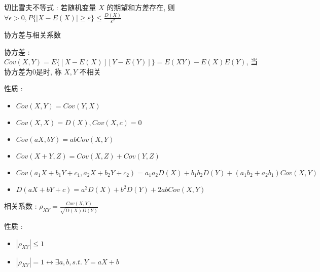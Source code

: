 \documentclass[UTF8, 12pt]{ctexart}
\begin{document}
	\noindent 切比雪夫不等式 : 若随机变量 $ X $ 的期望和方差存在, 则 $ \forall \epsilon > 0, P\{|X-E(X)| \geq \varepsilon\} \leq \frac{D(X)}{\varepsilon^{2}} $

	\noindent 协方差与相关系数

		协方差 : $ Cov(X, Y) = E\{[X-E(X)][Y-E(Y)]\} = E(XY) - E(X)E(Y) $, 当协方差为0是时, 称 $ X, Y $ 不相关

		性质 :
		\begin{itemize}[leftmargin = 4em]
			\item $ Cov(X, Y) = Cov(Y, X) $
			\item $ Cov(X, X) = D(X), Cov(X, c) = 0 $
			\item $ Cov(aX, bY) = abCov(X, Y) $
			\item $ Cov(X + Y, Z) = Cov(X, Z) + Cov(Y, Z) $
			\item $ Cov(a_{1}X + b_{1}Y + c_{1}, a_{2}X + b_{2}Y + c_{2}) = a_{1}a_{2}D(X) + b_{1}b_{2}D(Y) + (a_{1}b_{2} + a_{2}b_{1})Cov(X, Y) $
			\item $ D(aX + bY + c) = a^{2}D(X) + b^{2}D(Y) + 2abCov(X, Y) $
		\end{itemize}

		相关系数 : $ \rho_{XY} = \frac{Cov(X, Y)}{\sqrt{D(X)D(Y)}} $

		性质 :
		\begin{itemize}[leftmargin = 4em]
			\item $ |\rho_{XY}| \leq 1 $
			\item $ |\rho_{XY}| = 1 \leftrightarrow \exists a, b, s.t. \; Y = aX + b $
		\end{itemize}
\end{document}
